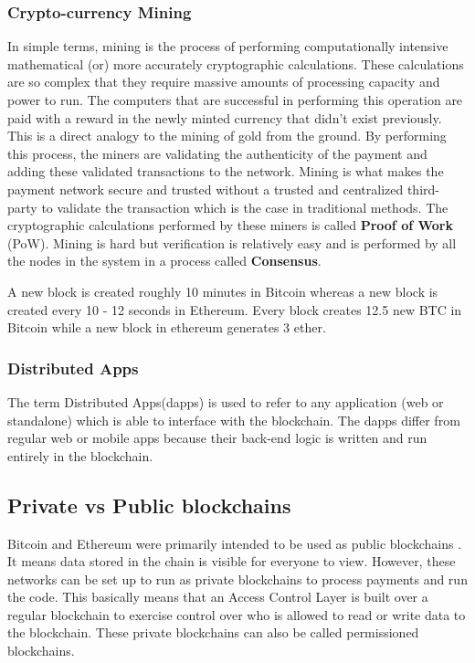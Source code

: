 \documentclass[11pt,openright]{report}
\begin{document}
\subsubsection{Crypto-currency Mining}\label{crypto-mining}
In simple terms, mining is the process of performing computationally intensive mathematical (or) more accurately cryptographic calculations. These calculations are so complex that they require massive amounts of processing capacity and power to run. The computers that are successful in performing this operation are paid with a reward in the newly minted currency that didn't exist previously. This is a direct analogy to the mining of gold from the ground. By performing this process, the miners are validating the authenticity of the payment and adding these validated transactions to the network. Mining is what makes the payment network secure and trusted without a trusted and centralized third-party to validate the transaction which is the case in traditional methods. The cryptographic calculations performed by these miners is called \textbf{Proof of Work} (PoW). Mining is hard but verification is relatively easy and is performed by all the nodes in the system in a process called \textbf{Consensus}.

A new block is created roughly 10 minutes in Bitcoin whereas a new block is created every 10 - 12 seconds in Ethereum. Every block creates 12.5 new BTC in Bitcoin while a new block in ethereum generates 3 ether.

\subsubsection{Distributed Apps}
The term Distributed Apps(dapps) is used to refer to any application (web or standalone) which is able to interface with the blockchain. 
The dapps differ from regular web or mobile apps because their back-end logic is written and run entirely in the blockchain.

\subsection{Private vs Public blockchains}
Bitcoin and Ethereum were primarily intended to be used as public blockchains \cite{privpubarticle}. It means data stored in the chain is visible for everyone to view. However, these networks can be set up to run as private blockchains to process payments and run the code. This basically means that an Access Control Layer is built over a regular blockchain to exercise control over who is allowed to read or write data to the blockchain. These private blockchains can also be called permissioned blockchains.
\end{document}
